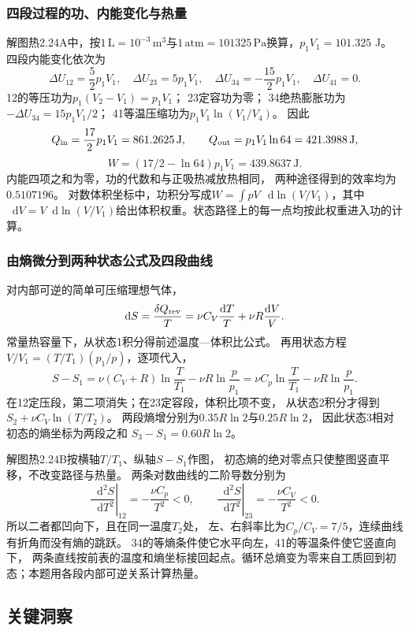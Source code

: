 \documentclass[UTF8,fontset=fandol,a4paper,11pt]{ctexart}
\newcommand{\dd}{\mathop{}\!\mathrm{d}}
\begin{document}
\subsubsection*{四段过程的功、内能变化与热量}
解图热2.24A中，按$1\,\mathrm{L}=10^{-3}\,\mathrm{m^3}$与$1\,\mathrm{atm}=101325\,\mathrm{Pa}$换算，$p_1V_1=101.325$ J。
四段内能变化依次为
\[
\Delta U_{12}=\frac52p_1V_1,\quad
\Delta U_{23}=5p_1V_1,\quad
\Delta U_{34}=-\frac{15}{2}p_1V_1,\quad
\Delta U_{41}=0.
\]
12的等压功为$p_1(V_2-V_1)=p_1V_1$；
23定容功为零；
34绝热膨胀功为$-\Delta U_{34}=15p_1V_1/2$；
41等温压缩功为$p_1V_1\ln(V_1/V_4)$。
因此
\[
Q_{\rm in}=\frac{17}{2}p_1V_1=861.2625\,\mathrm J,\qquad
Q_{\rm out}=p_1V_1\ln64=421.3988\,\mathrm J,
\]
\[
W=(17/2-\ln64)p_1V_1=439.8637\,\mathrm J.
\]
内能四项之和为零，功的代数和与正吸热减放热相同，
两种途径得到的效率均为$0.5107196$。
对数体积坐标中，功积分写成$W=\int pV\,\dd\ln(V/V_1)$，其中
$\dd V=V\dd\ln(V/V_1)$给出体积权重。状态路径上的每一点均按此权重进入功的计算。

\subsubsection*{由熵微分到两种状态公式及四段曲线}
对内部可逆的简单可压缩理想气体，
\[
\dd S=\frac{\delta Q_{\rm rev}}T
=\nu C_V\frac{\dd T}{T}+\nu R\frac{\dd V}{V}.
\]
常量热容量下，从状态1积分得前述温度—体积比公式。
再用状态方程
$V/V_1=(T/T_1)(p_1/p)$，逐项代入，
\[
S-S_1=\nu(C_V+R)\ln\frac T{T_1}-\nu R\ln\frac p{p_1}
=\nu C_p\ln\frac T{T_1}-\nu R\ln\frac p{p_1}.
\]
在12定压段，第二项消失；在23定容段，体积比项不变，
从状态2积分才得到$S_2+\nu C_V\ln(T/T_2)$。
两段熵增分别为$0.35R\ln2$与$0.25R\ln2$，
因此状态3相对初态的熵坐标为两段之和 $S_3-S_1=0.60R\ln2$。

解图热2.24B按横轴$T/T_1$、纵轴$S-S_1$作图，
初态熵的绝对零点只使整图竖直平移，不改变路径与热量。
两条对数曲线的二阶导数分别为
\[
\left.\frac{\dd^2S}{\dd T^2}\right|_{12}
=-\frac{\nu C_p}{T^2}<0,\qquad
\left.\frac{\dd^2S}{\dd T^2}\right|_{23}
=-\frac{\nu C_V}{T^2}<0.
\]
所以二者都凹向下，且在同一温度$T_2$处，
左、右斜率比为$C_p/C_V=7/5$，连续曲线有折角而没有熵的跳跃。
34的等熵条件使它水平向左，41的等温条件使它竖直向下，
两条直线按前表的温度和熵坐标接回起点。循环总熵变为零来自工质回到初态；本题用各段内部可逆关系计算热量。




\subsection*{关键洞察}
\end{document}
